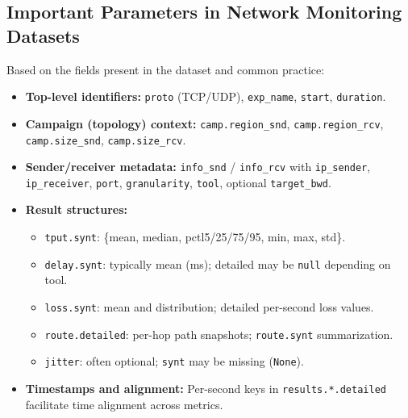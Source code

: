\documentclass[11pt,a4paper]{article}
\begin{document}
\subsection*{Important Parameters in Network Monitoring Datasets}
Based on the fields present in the dataset and common practice:
\begin{itemize}[leftmargin=1.2em]
  \item \textbf{Top-level identifiers:} \texttt{proto} (TCP/UDP), \texttt{exp\_name}, \texttt{start}, \texttt{duration}.
  \item \textbf{Campaign (topology) context:} \texttt{camp.region\_snd}, \texttt{camp.region\_rcv}, \texttt{camp.size\_snd}, \texttt{camp.size\_rcv}.
  \item \textbf{Sender/receiver metadata:} \texttt{info\_snd} / \texttt{info\_rcv} with \texttt{ip\_sender}, \texttt{ip\_receiver}, \texttt{port}, \texttt{granularity}, \texttt{tool}, optional \texttt{target\_bwd}.
  \item \textbf{Result structures:}
  \begin{itemize}[noitemsep]
    \item \texttt{tput.synt}: \{mean, median, pctl5/25/75/95, min, max, std\}.
    \item \texttt{delay.synt}: typically mean (ms); detailed may be \texttt{null} depending on tool.
    \item \texttt{loss.synt}: mean and distribution; detailed per-second loss values.
    \item \texttt{route.detailed}: per-hop path snapshots; \texttt{route.synt} summarization.
    \item \texttt{jitter}: often optional; \texttt{synt} may be missing (\texttt{None}).
  \end{itemize}
  \item \textbf{Timestamps and alignment:} Per-second keys in \texttt{results.*.detailed} facilitate time alignment across metrics.
\end{itemize}
\end{document}
